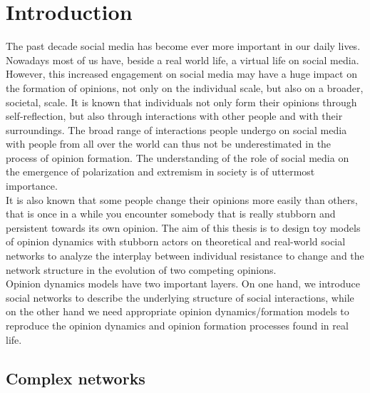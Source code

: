 \documentclass[11 pt , letterpaper , twoside , openright]{book}
\begin{document}
\chapter{Introduction}

The past decade social media has become ever more important in our daily lives. Nowadays most of us have, beside a real world life, a virtual life on social media. However, this increased engagement on social media may have a huge impact on the formation of opinions, not only on the individual scale, but also on a broader, societal, scale. It is known that individuals not only form their opinions through self-reflection, but also through interactions with other people and with their surroundings. The broad range of interactions people undergo on social media with people from all over the world can thus not be underestimated in the process of opinion formation. The understanding of the role of social media on the emergence of polarization and extremism in society is of uttermost importance.\\
 It is also known that some people change their opinions more easily than others, that is once in a while you encounter somebody that is really stubborn and persistent towards its own opinion. The aim of this thesis is to design toy models of opinion dynamics with stubborn actors on theoretical and real-world social networks to analyze the interplay between individual resistance to change and the network structure in the evolution of two competing opinions.\\
Opinion dynamics models have two important layers. On one hand, we introduce social networks to describe the underlying structure of social interactions, while on the other hand we need appropriate opinion dynamics/formation models to reproduce the opinion dynamics and opinion formation processes found in real life. 

\section{Complex networks}
\end{document}
